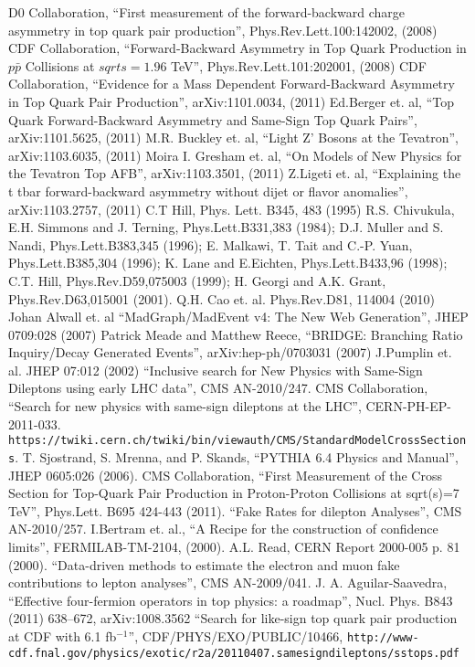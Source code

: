 \begin{thebibliography}{99}

 {D0 Collaboration, ``First measurement of the forward-backward charge asymmetry in top quark pair production'', Phys.Rev.Lett.100:142002, (2008)}
 {CDF Collaboration, ``Forward-Backward Asymmetry in Top Quark Production in $p\bar{p}$ Collisions at $sqrt{s}=1.96$ TeV'', Phys.Rev.Lett.101:202001, (2008)}
 {CDF Collaboration, ``Evidence for a Mass Dependent Forward-Backward Asymmetry in Top Quark Pair Production'', arXiv:1101.0034, (2011)}
 {Ed.Berger et. al, ``Top Quark Forward-Backward Asymmetry and Same-Sign Top Quark Pairs'', arXiv:1101.5625, (2011)}
 {M.R. Buckley et. al, ``Light Z' Bosons at the Tevatron'', arXiv:1103.6035, (2011)}
 {Moira I. Gresham et. al, ``On Models of New Physics for the Tevatron Top AFB'', arXiv:1103.3501, (2011)}
 {Z.Ligeti et. al, ``Explaining the t tbar forward-backward asymmetry without dijet or flavor anomalies'', arXiv:1103.2757, (2011)}
 {C.T Hill, Phys. Lett. B345, 483 (1995)}
 {R.S. Chivukula, E.H. Simmons and J. Terning, Phys.Lett.B331,383 (1984); D.J. Muller and S. Nandi, Phys.Lett.B383,345 (1996); E. Malkawi, T. Tait 
and C.-P. Yuan, Phys.Lett.B385,304 (1996); K. Lane and E.Eichten, Phys.Lett.B433,96 (1998); C.T. Hill, Phys.Rev.D59,075003 (1999); H. Georgi and A.K. Grant, 
Phys.Rev.D63,015001 (2001).}
 {Q.H. Cao et. al. Phys.Rev.D81, 114004 (2010)}
 {Johan Alwall et. al ``MadGraph/MadEvent v4: The New Web Generation'', JHEP 0709:028 (2007)}
 {Patrick Meade and Matthew Reece, ``BRIDGE: Branching Ratio Inquiry/Decay Generated Events'', 	arXiv:hep-ph/0703031 (2007)}
 {J.Pumplin et. al. JHEP 07:012 (2002)}
 {``Inclusive search for New Physics with Same-Sign Dileptons using early LHC data''}, CMS AN-2010/247.
 {CMS Collaboration, ``Search for new physics with same-sign dileptons at the LHC''}, CERN-PH-EP-2011-033.
 {\tt https://twiki.cern.ch/twiki/bin/viewauth/CMS/StandardModelCrossSections}.
 {T. Sjostrand, S. Mrenna, and P. Skands, ``PYTHIA 6.4 Physics and Manual'', JHEP 0605:026 (2006)}.
 {CMS Collaboration, ``First Measurement of the Cross Section for Top-Quark Pair Production in Proton-Proton Collisions at 
sqrt(s)=7 TeV'', Phys.Lett. B695 424-443 (2011)}.
 {``Fake Rates for dilepton Analyses''}, CMS AN-2010/257.
 {I.Bertram et. al., ``A Recipe for the construction of confidence limits'', FERMILAB-TM-2104, (2000).}
 {A.L. Read, CERN Report 2000-005 p. 81 (2000).}
 {``Data-driven methods to estimate the electron and muon fake contributions to lepton analyses''}, CMS AN-2009/041.
 {J. A. Aguilar-Saavedra, “Effective four-fermion operators in top physics: a roadmap”, Nucl. Phys. B843 (2011) 638–672, arXiv:1008.3562}
 {``Search for like-sign top quark pair production at CDF with 6.1 fb$^{-1}$''}, CDF/PHYS/EXO/PUBLIC/10466, 
{\tt http://www-cdf.fnal.gov/physics/exotic/r2a/20110407.samesigndileptons/sstops.pdf}

\end{thebibliography}
